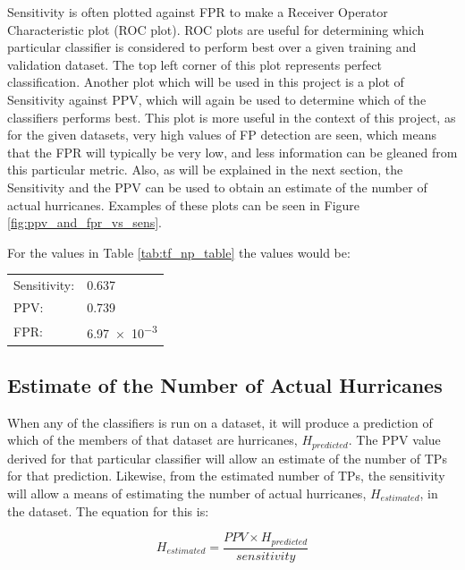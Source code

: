 \documentclass[pdftex,12pt,a4paper]{report}
\begin{document}
Sensitivity is often plotted against FPR to make a Receiver Operator Characteristic plot (ROC plot).
ROC plots are useful for determining which particular classifier is considered to perform best over
a given training and validation dataset. The top left corner of this plot represents perfect
classification. Another plot which will be used in this project is a plot of Sensitivity against
PPV, which will again be used to determine which of the classifiers performs best. This plot is more
useful in the context of this project, as for the given datasets, very high values of FP detection
are seen, which means that the FPR will typically be very low, and less information can be gleaned
from this particular metric. Also, as will be explained in the next section, the Sensitivity and the
PPV can be used to obtain an estimate of the number of actual hurricanes. Examples of these plots
can be seen in Figure \ref{fig:ppv_and_fpr_vs_sens}.

For the values in Table \ref{tab:tf_np_table} the values would be:

\begin{table}[hb!]
    \centering
    \begin{tabular}{ l l }
        Sensitivity: & \SI{0.637}{} \\
        PPV: & \SI{0.739}{} \\
        FPR: & \SI{6.97e-3}{} \\
    \end{tabular}
    \label{tab:success_metric_table}
\end{table}

\subsection{Estimate of the Number of Actual Hurricanes}
\label{sec:estimated_hurricanes}

When any of the classifiers is run on a dataset, it will produce a prediction of which of the
members of that dataset are hurricanes, $H_{predicted}$. The PPV value derived for that particular classifier will
allow an estimate of the number of TPs for that prediction. Likewise, from the estimated number of
TPs, the sensitivity will allow a means of estimating the number of actual hurricanes, $H_{estimated}$,
in the dataset. The equation for this is:

\begin{equation}
    H_{estimated} = \frac{PPV \times H_{predicted}}{sensitivity}
    \label{eqn:n_actual_hurricane}
\end{equation}
\end{document}
